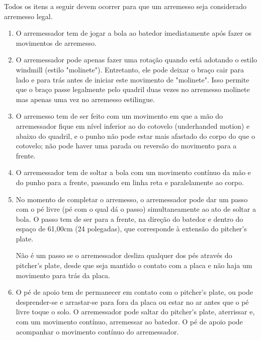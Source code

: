 Todos os itens a seguir devem ocorrer para que um arremesso seja considerado arremesso legal.
\begin{enumerate}[label=(\alph*)]
	\item O arremessador tem de jogar a bola ao batedor imediatamente após fazer os movimentos de arremesso.
	\item O arremessador pode apenas fazer uma rotação quando está adotando o estilo \gls{windmill} (estilo "molinete"). Entretanto, ele pode deixar o braço cair para  lado e para trás antes de iniciar este movimento de "molinete". Isso permite que o braço passe legalmente pelo quadril duas vezes no arremesso molinete mas apenas uma vez no arremesso estilingue.
	\item  O arremesso tem de ser feito com um movimento em que a mão do arremessador fique em nível inferior ao do cotovelo (\gls{underhanded motion}) e abaixo do quadril, e o punho não pode estar mais afastado do corpo do que o cotovelo; não pode haver uma parada ou reversão do movimento para a frente.
	\item  O arremessador tem de soltar a bola com um movimento contínuo da mão e do punho para a frente, passando em linha reta e paralelamente ao corpo.
	\item  No momento de completar o arremesso, o arremessador pode dar um passo com o pé livre (pé com o qual dá o passo) simultaneamente ao ato de soltar a  bola. O passo tem de ser para a frente, na direção do batedor e dentro do espaço de 61,00cm (24 polegadas), que corresponde à extensão do \gls{pitcher's plate}.

	 Não é um passo se o arremessador desliza qualquer dos pés através do \gls{pitcher's plate}, desde que seja mantido o contato com a placa e não haja um movimento para trás da placa.

	\item  O pé de apoio tem de permanecer em contato com o \gls{pitcher's plate}, ou pode desprender-se e arrastar-se para fora da placa ou estar no ar antes que o pé livre toque o solo. O arremessador pode saltar do \gls{pitcher's plate}, aterrissar e, com um movimento contínuo, arremessar ao batedor. O pé de apoio pode acompanhar o movimento contínuo do arremessador.


\end{enumerate}
